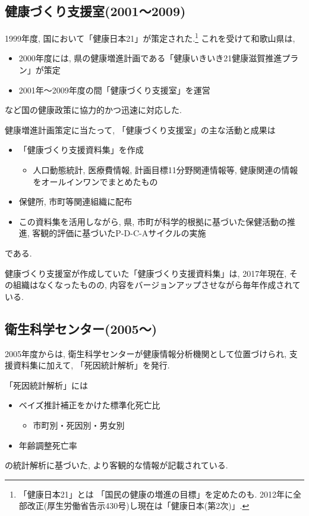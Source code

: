 \subsection{健康づくり支援室(2001〜2009)}
1999年度, 国において「健康日本21」が策定された.\footnote{「健康日本21」とは
	「国民の健康の増進の目標」を定めたのも. 2012年に全部改正(厚生労働省告示430号)し現在は「健康日本(第2次)」.}
これを受けて和歌山県は,
\begin{itemize} \setlength{\itemsep}{-0.5mm} \setlength{\parskip}{-0.5mm}
	\item 2000年度には, 県の健康増進計画である「健康いきいき21健康滋賀推進プラン」が策定
	\item 2001年〜2009年度の間「健康づくり支援室」を運営
\end{itemize}
など国の健康政策に協力的かつ迅速に対応した.

健康増進計画策定に当たって, 「健康づくり支援室」の主な活動と成果は
\begin{itemize} \setlength{\itemsep}{-0.5mm} \setlength{\parskip}{-0.5mm}
	\item 「健康づくり支援資料集」を作成
	      \begin{itemize} \setlength{\itemsep}{-0.5mm} \setlength{\parskip}{-0.5mm}
		      \item 人口動態統計, 医療費情報, 計画目標11分野関連情報等, 健康関連の情報をオールインワンでまとめたもの
	      \end{itemize}
	\item 保健所, 市町等関連組織に配布
	\item この資料集を活用しながら, 県, 市町が科学的根拠に基づいた保健活動の推進, 客観的評価に基づいたP-D-C-Aサイクルの実施
\end{itemize}
である.

健康づくり支援室が作成していた「健康づくり支援資料集」は, 2017年現在, その組織はなくなったものの,
内容をバージョンアップさせながら毎年作成されている.

\subsection{衛生科学センター(2005〜)}

2005年度からは, 衛生科学センターが健康情報分析機関として位置づけられ, 支援資料集に加えて,
「死因統計解析」を発行.

「死因統計解析」には
\begin{itemize} \setlength{\itemsep}{-0.5mm} \setlength{\parskip}{-0.5mm}
	\item ベイズ推計補正をかけた標準化死亡比
	      \begin{itemize} \setlength{\itemsep}{-0.5mm} \setlength{\parskip}{-0.5mm}
		      \item 市町別・死因別・男女別
	      \end{itemize}
	\item 年齢調整死亡率
\end{itemize}
の統計解析に基づいた, より客観的な情報が記載されている.

